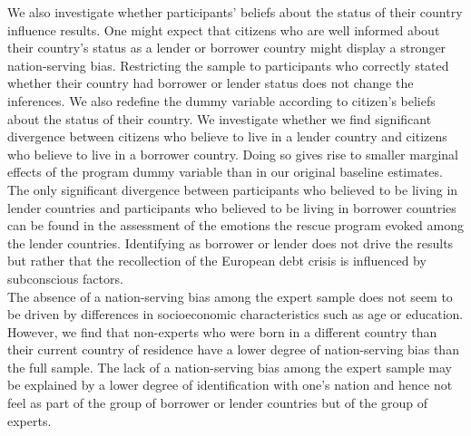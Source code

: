 We also investigate whether participants' beliefs about the status of their country influence results. One might expect that citizens who are well informed about their country's status as a lender or borrower country might display a stronger nation-serving bias. Restricting the sample to participants who correctly stated whether their country had borrower or lender status does not change the inferences. We also redefine the dummy variable according to citizen's beliefs about the status of their country. We investigate whether we find significant divergence between citizens who believe to live in a lender country and citizens who believe to live in a borrower country. Doing so gives rise to smaller marginal effects of the program dummy variable than in our original baseline estimates. The only significant divergence between participants who believed to be living in lender countries and participants who believed to be living in borrower countries can be found in the assessment of the emotions the rescue program evoked among the lender countries. Identifying as borrower or lender does not drive the results but rather that the recollection of the European debt crisis is influenced by subconscious factors. 
\\
The absence of a nation-serving bias among the expert sample does not seem to be driven by differences in socioeconomic characteristics such as age or education.  However, we find that non-experts who were born in a different country than their current country of residence have a lower degree of nation-serving bias than the full sample. The lack of  a nation-serving bias among the expert sample may be explained by a lower degree of identification with one's nation and hence not feel as part of the group of borrower or lender countries but of the group of experts. 

